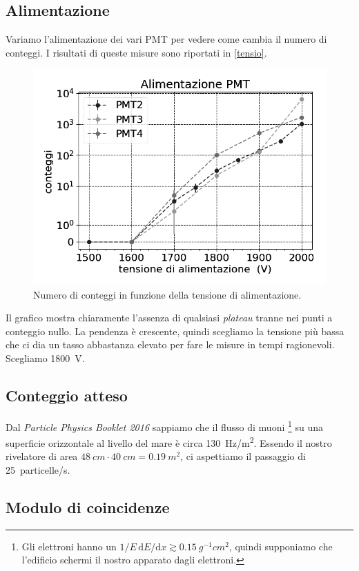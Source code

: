 \documentclass[a4paper]{article}
\newcommand*\de{\mathrm{d}}
\begin{document}
\subsection*{Alimentazione}

Variamo l'alimentazione dei vari PMT per vedere come cambia il numero di conteggi. I risultati di queste misure sono  riportati in \autoref{tensio}. 

\begin{figure}[h]
\centering
\includegraphics[width=8 cm]{tensio_pmt}
\caption{Numero di conteggi in funzione della tensione di alimentazione.}
\label{tensio}
\end{figure}

Il grafico mostra chiaramente l'assenza di qualsiasi \emph{plateau} tranne nei punti a conteggio nullo.
La pendenza è crescente, quindi scegliamo la tensione più bassa che ci dia un tasso abbastanza elevato
per fare le misure in tempi ragionevoli.
Scegliamo \SI{1800}V.

\subsection*{Conteggio atteso}

Dal \emph{Particle Physics Booklet 2016} sappiamo che il flusso di muoni%
\footnote{Gli elettroni hanno un $1/E\, \de E/\de x \gtrsim \SI{0.15}{g^{-1}cm^{2}}$, quindi supponiamo che l'edificio schermi il nostro apparato dagli elettroni.}
 su una superficie orizzontale al livello del mare è circa \SI{130}{Hz/m^2}.
Essendo il nostro rivelatore di area $\SI{48}{cm}\cdot\SI{40}{cm}=\SI{0.19}{m^2}$,
ci aspettiamo il passaggio di \SI{25}{particelle/s}.

\subsection*{Modulo di coincidenze}
\end{document}
